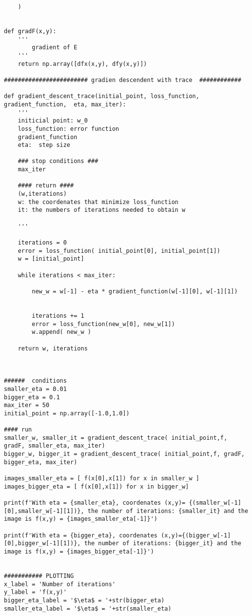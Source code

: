 \begin{verbatim}
    )


def gradF(x,y):
    ''' 
        gradient of E
    '''
    return np.array([dfx(x,y), dfy(x,y)])

######################## gradien descendent with trace  ############

def gradient_descent_trace(initial_point, loss_function, gradient_function,  eta, max_iter):
    '''
    initicial point: w_0 
    loss_function: error function 
    gradient_function
    eta:  step size 

    ### stop conditions ###
    max_iter

    #### return ####
    (w,iterations)
    w: the coordenates that minimize loss_function
    it: the numbers of iterations needed to obtain w
    
    '''

    iterations = 0
    error = loss_function( initial_point[0], initial_point[1])
    w = [initial_point]
  
    while iterations < max_iter: 

        new_w = w[-1] - eta * gradient_function(w[-1][0], w[-1][1])
        
        
        iterations += 1
        error = loss_function(new_w[0], new_w[1])
        w.append( new_w ) 
    
    return w, iterations



######  conditions  
smaller_eta = 0.01
bigger_eta = 0.1 
max_iter = 50
initial_point = np.array([-1.0,1.0])

#### run 
smaller_w, smaller_it = gradient_descent_trace( initial_point,f, gradF, smaller_eta, max_iter)
bigger_w, bigger_it = gradient_descent_trace( initial_point,f, gradF, bigger_eta, max_iter)

images_smaller_eta = [ f(x[0],x[1]) for x in smaller_w ]
images_bigger_eta = [ f(x[0],x[1]) for x in bigger_w]

print(f'With eta = {smaller_eta}, coordenates (x,y)= {(smaller_w[-1][0],smaller_w[-1][1])}, the number of iterations: {smaller_it} and the image is f(x,y) = {images_smaller_eta[-1]}')

print(f'With eta = {bigger_eta}, coordenates (x,y)={(bigger_w[-1][0],bigger_w[-1][1])}, the number of iterations: {bigger_it} and the image is f(x,y) = {images_bigger_eta[-1]}')


########### PLOTTING
x_label = 'Number of iterations'
y_label = 'f(x,y)'
bigger_eta_label = '$\eta$ = '+str(bigger_eta)
smaller_eta_label = '$\eta$ = '+str(smaller_eta)


\end{verbatim}
